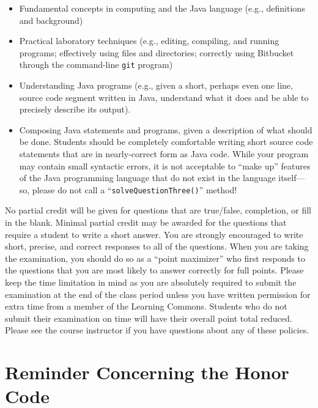 \vspace*{-.05in}
\begin{itemize}

  \itemsep 0in

\item Fundamental concepts in computing and the Java language (e.g., definitions and background)

\item Practical laboratory techniques (e.g., editing, compiling, and running programs; effectively using files and
  directories; correctly using Bitbucket through the command-line {\tt git} program)

\item Understanding Java programs (e.g., given a short, perhaps even one line, source code segment written in Java,
  understand what it does and be able to precisely describe its output).

\item Composing Java statements and programs, given a description of what should be done. Students should be completely
  comfortable writing short source code statements that are in nearly-correct form as Java code. While your program may
  contain small syntactic errors, it is not acceptable to ``make up'' features of the Java programming language that do
  not exist in the language itself---so, please do not call a ``{\tt solveQuestionThree()}'' method!

\end{itemize}

\noindent No partial credit will be given for questions that are true/false, completion, or fill in the blank. Minimal
partial credit may be awarded for the questions that require a student to write a short answer. You are strongly
encouraged to write short, precise, and correct responses to all of the questions. When you are taking the examination, you
should do so as a ``point maximizer'' who first responds to the questions that you are most likely to answer correctly for
full points. Please keep the time limitation in mind as you are absolutely required to submit the examination at the end
of the class period unless you have written permission for extra time from a member of the Learning Commons. Students
who do not submit their examination on time will have their overall point total reduced. Please see the course instructor if
you have questions about any of these policies.

\section*{Reminder Concerning the Honor Code}

